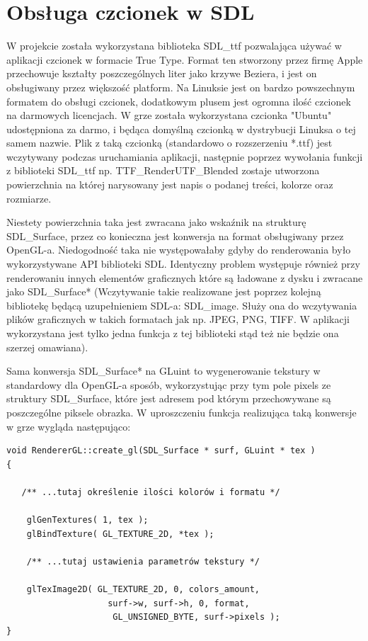 \section{Obsługa czcionek w SDL}
W projekcie została wykorzystana biblioteka SDL\_ttf pozwalająca używać w aplikacji czcionek w formacie True Type. Format ten stworzony przez firmę Apple przechowuje kształty poszczególnych liter jako krzywe Beziera, i jest on obsługiwany przez większość platform. Na Linuksie jest on bardzo powszechnym formatem do obsługi czcionek, dodatkowym plusem jest ogromna ilość czcionek na darmowych licencjach. W grze została wykorzystana czcionka "Ubuntu" udostępniona za darmo, i będąca domyślną czcionką w dystrybucji Linuksa o tej samem nazwie. Plik z taką czcionką (standardowo o rozszerzeniu *.ttf) jest wczytywany podczas uruchamiania aplikacji, następnie poprzez wywołania funkcji z biblioteki SDL\_ttf np. TTF\_RenderUTF\_Blended zostaje utworzona powierzchnia na której narysowany jest napis o podanej treści, kolorze oraz rozmiarze. 

Niestety powierzchnia taka jest zwracana jako wskaźnik na strukturę SDL\_Surface, przez co konieczna jest konwersja na format obsługiwany przez OpenGL-a. Niedogodność taka nie występowałaby gdyby do renderowania było wykorzystywane API biblioteki SDL. Identyczny problem występuje również przy renderowaniu innych elementów graficznych które są ładowane z dysku i zwracane jako SDL\_Surface* (Wczytywanie takie realizowane jest poprzez kolejną bibliotekę będącą uzupełnieniem SDL-a: SDL\_image. Służy ona do wczytywania plików graficznych w takich formatach jak np. JPEG, PNG, TIFF. W aplikacji wykorzystana jest tylko jedna funkcja 
z tej biblioteki stąd też nie będzie ona szerzej omawiana).

Sama konwersja SDL\_Surface* na GLuint to wygenerowanie tekstury w standardowy dla OpenGL-a sposób, wykorzystując przy tym pole pixels ze struktury SDL\_Surface, które jest adresem pod którym przechowywane są poszczególne piksele obrazka. W uproszczeniu funkcja realizująca taką konwersje w grze wygląda następująco:

\begingroup
\fontsize{10pt}{12pt}\selectfont
\begin{verbatim}  
void RendererGL::create_gl(SDL_Surface * surf, GLuint * tex )
{
 
   /** ...tutaj określenie ilości kolorów i formatu */
  
    glGenTextures( 1, tex );
    glBindTexture( GL_TEXTURE_2D, *tex );

    /** ...tutaj ustawienia parametrów tekstury */

    glTexImage2D( GL_TEXTURE_2D, 0, colors_amount,
    			  	surf->w, surf->h, 0, format, 
    			 	 GL_UNSIGNED_BYTE, surf->pixels );
}
\end{verbatim}
\endgroup

